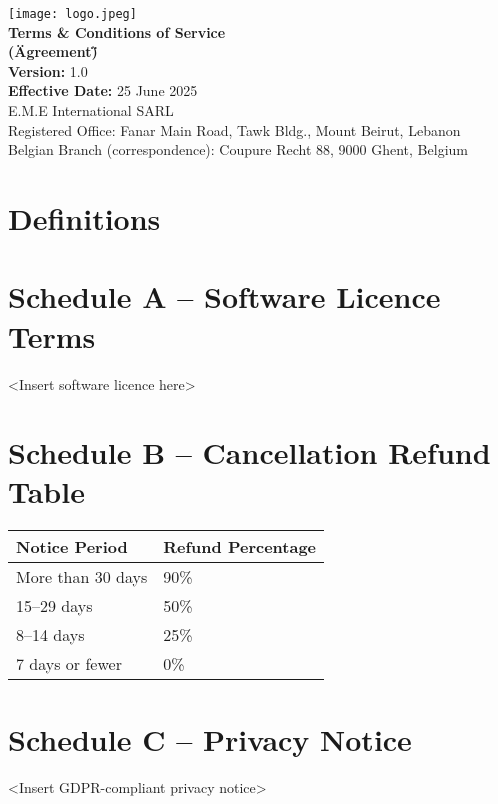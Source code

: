 \documentclass[11pt,a4paper]{article}
\newcommand{\Company}{E.M.E International SARL}
\newcommand{\DocumentTitle}{\huge\bfseries Terms \& Conditions of Service\\[0.3em]{\normalsize (\"Agreement\")}}
\begin{document}
\onehalfspacing

\begin{center}
    \vspace*{3cm}
    \texttt{[image: logo.jpeg]}\\[2cm]
    {\DocumentTitle}\\[2cm]
    \textbf{Version:} 1.0 \\[0.3em]
    \textbf{Effective Date:} 25 June 2025 \\[3cm]
    \color{emeCharcoal}\Company\\
    Registered Office: Fanar Main Road, Tawk Bldg., Mount Beirut, Lebanon\\[0.5em]
    Belgian Branch (correspondence): Coupure Recht 88, 9000 Ghent, Belgium
\end{center}
\clearpage

\tableofcontents
\clearpage

\section{Definitions}


\appendix
\section*{Schedule A – Software Licence Terms}
\textless Insert software licence here\textgreater

\section*{Schedule B – Cancellation Refund Table}
\begin{longtable}{@{}ll@{}}
\toprule
Notice Period & Refund Percentage\\\midrule
More than 30 days & 90\%\\
15–29 days & 50\%\\
8–14 days & 25\%\\
7 days or fewer & 0\%\\\bottomrule
\end{longtable}

\section*{Schedule C – Privacy Notice}
\textless Insert GDPR-compliant privacy notice\textgreater
\end{document}
